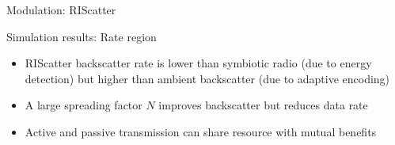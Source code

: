 \documentclass[presentation,xcolor={table},9pt]{beamer}
\begin{document}
\begin{section}{Modulation: RIScatter}
	\begin{frame}{Simulation results: Rate region}
		\begin{figure}[!t]
			\centering
			\subfloat{
				\resizebox{0.48\linewidth}{!}{
					
				}
			}
			\subfloat{
				\resizebox{0.48\linewidth}{!}{
					
				}
			}
		\end{figure}
		\begin{itemize}
			\item RIScatter backscatter rate is lower than symbiotic radio (due to energy detection) but higher than ambient backscatter (due to adaptive encoding)
			\item A large spreading factor $N$ improves backscatter  but reduces data rate
			\item Active and passive transmission can share resource with mutual benefits
		\end{itemize}
	\end{frame}
\end{section}
\end{document}
